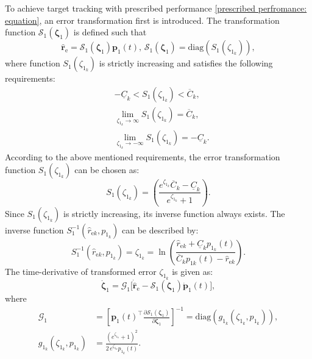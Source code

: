 \documentclass[lettersize,journal]{IEEEtran}
\begin{document}
To achieve target tracking with prescribed performance \eqref{prescribed perfromance: equation}, an error transformation first is introduced. The transformation function $\mathcal{S}_1(\boldsymbol{\zeta}_1)$ is defined such that
\begin{equation}
    \label{error transformation: equation}
    \hat{\boldsymbol{r}}_\text{e} = \mathcal{S}_1(\boldsymbol{\zeta}_1) \boldsymbol{p}_1(t), \, \mathcal{S}_1(\boldsymbol{\zeta}_1) = \text{diag}(S_1(\zeta_{1_k})),
\end{equation}
where function $S_1(\zeta_{1_k})$ is strictly increasing and satisfies the following requirements:
\begin{align*}
&-\underline{C}_{k} < S_1(\zeta_{1_k}) < \overline{C}_{k}, \\ 
&\lim_{\zeta_{1_k} \to \infty} S_1(\zeta_{1_k}) = \overline{C}_{k}, \\
&\lim_{\zeta_{1_k} \to -\infty} S_1(\zeta_{1_k}) = -\underline{C}_{k}.
\end{align*}
According to the above mentioned requirements, the error transformation function $S_1(\zeta_{1_k})$ can be chosen as:
\begin{equation}
    \label{transformation function: equation}
    S_1(\zeta_{1_k}) = \left(\frac{e^{\zeta_{1_k}} \overline{C}_{k} - \underline{C}_{k}}{e^{\zeta_{1_k}} + 1} \right).
\end{equation}
Since $S_1(\zeta_{1_k})$ is strictly increasing, its inverse function always exists. 
The inverse function $S_1^{-1}(\hat{r}_{\text{e}k}, p_{1_k})$ can be described by:
\begin{equation} \label{inverse transformation function: equation}
    S_1^{-1}(\hat{r}_{\text{e}k}, p_{1_k}) = \zeta_{1_k} = \ln{\left(\frac{\hat{r}_{\text{e}k} + \underline{C}_{k} p_{1_k}(t)}{\overline{C}_{k} p_{1k}(t) - \hat{r}_{\text{e}k}} \right)}.
\end{equation}
The time-derivative of transformed error $\zeta_{1_k}$ is given as:
\begin{equation} \label{transformed error derivative: equation}
    \dot{\boldsymbol{\zeta}}_1 = \mathcal{G}_1 \big[ \dot{\hat{\boldsymbol{r}}}_{\text{e}} - \mathcal{S}_1(\boldsymbol{\zeta}_1) \dot{\boldsymbol{p}}_1(t)\big],    
\end{equation}
where
\begin{align*}
    \mathcal{G}_1 &= \left[\boldsymbol{p}_1(t)^{\top} \frac{\partial \mathcal{S}_1(\boldsymbol{\zeta}_1)}{\partial \boldsymbol{\zeta}_1}\right]^{-1} = \text{diag}(g_{1_k}(\zeta_{1_k}, p_{1_k})), \nonumber \\
    g_{1_k}(\zeta_{1_k}, p_{1_k}) &= \frac{(e^{\zeta_{1_k}}+1)^2}{2\,e^{\zeta_{1_k}} p_{1_k}(t)}.
\end{align*}
\end{document}
